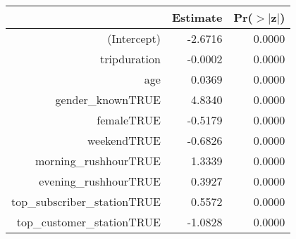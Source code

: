 \begin{table}[ht]
\begin{heightresizeenv}
\begin{tabular}{rrr}
  \toprule
 & Estimate & Pr($>$$|$z$|$) \\ 
  \midrule
(Intercept) & -2.6716 & 0.0000 \\ 
  tripduration & -0.0002 & 0.0000 \\ 
  age & 0.0369 & 0.0000 \\ 
  gender\_knownTRUE & 4.8340 & 0.0000 \\ 
  femaleTRUE & -0.5179 & 0.0000 \\ 
  weekendTRUE & -0.6826 & 0.0000 \\ 
  morning\_rushhourTRUE & 1.3339 & 0.0000 \\ 
  evening\_rushhourTRUE & 0.3927 & 0.0000 \\ 
  top\_subscriber\_stationTRUE & 0.5572 & 0.0000 \\ 
  top\_customer\_stationTRUE & -1.0828 & 0.0000 \\ 
   \bottomrule
\end{tabular}
\end{heightresizeenv}
\end{table}
